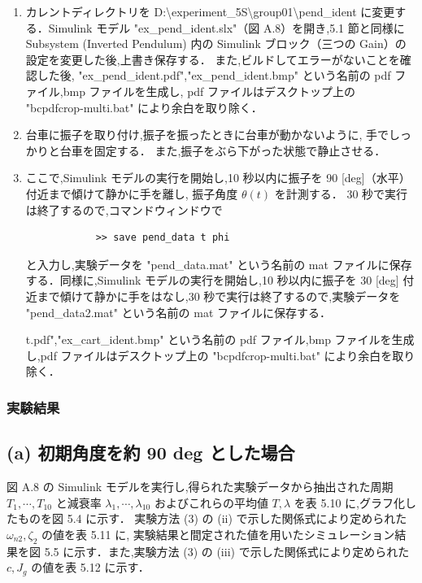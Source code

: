 \begin{enumerate}
  \item カレントディレクトリを D:\textbackslash experiment\_5S\textbackslash group01\textbackslash pend\_ident に変更する．Simulink モデル "ex\_pend\_ident.slx"（図 A.8）を開き,5.1 節と同様に Subsystem (Inverted Pendulum) 内の Simulink ブロック（三つの Gain）の設定を変更した後,上書き保存する．
        また,ビルドしてエラーがないことを確認した後,
        "ex\_pend\_ident.pdf","ex\_pend\_ident.bmp" 
        という名前の pdf ファイル,bmp ファイルを生成し,
        pdf ファイルはデスクトップ上の "bcpdfcrop-multi.bat" 
        により余白を取り除く．
        
  \item 台車に振子を取り付け,振子を振ったときに台車が動かないように,
        手でしっかりと台車を固定する．
        また,振子をぶら下がった状態で静止させる．
        
  \item ここで,Simulink モデルの実行を開始し,10 秒以内に振子を 90 [deg]（水平）付近まで傾けて静かに手を離し,
        振子角度 \( \theta(t) \) を計測する．
        30 秒で実行は終了するので,コマンドウィンドウで
        \begin{tcolorbox}[colback=gray!5!white,colframe=gray!75!black]
          \begin{lstlisting}
            >> save pend_data t phi
            \end{lstlisting}
        \end{tcolorbox}
        と入力し,実験データを "pend\_data.mat" という名前の mat ファイルに保存する．同様に,Simulink モデルの実行を開始し,10 秒以内に振子を 30 [deg] 付近まで傾けて静かに手をはなし,30 秒で実行は終了するので,実験データを "pend\_data2.mat" という名前の mat ファイルに保存する．
        
        t.pdf","ex\_cart\_ident.bmp" という名前の pdf ファイル,bmp ファイルを生成し,pdf ファイルはデスクトップ上の "bcpdfcrop-multi.bat" により余白を取り除く．
\end{enumerate}

\subsubsection{実験結果}
\subsection*{(a) 初期角度を約 90 deg とした場合}

図 A.8 の Simulink モデルを実行し,得られた実験データから抽出された周期 
\( T_1, \cdots, T_{10} \) と減衰率 \( \lambda_1, \cdots, \lambda_{10} \) 
およびこれらの平均値 \( T, \lambda \) を表 5.10 に,グラフ化したものを図 5.4 に示す．
実験方法 (3) の (ii) で示した関係式により定められた \( \omega_{n2}, \zeta_2 \) の値を表 5.11 に,
実験結果と間定された値を用いたシミュレーション結果を図 5.5 に示す．また,実験方法 (3) の (iii) 
で示した関係式により定められた \( c, J_g \) の値を表 5.12 に示す．

